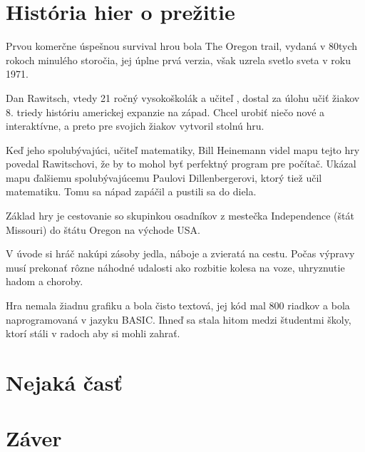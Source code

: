 \documentclass[10pt,twoside,slovak,a4paper]{article}
\begin{document}
\section{História hier o prežitie }
Prvou komerčne úspešnou survival hrou bola The Oregon trail, vydaná v 80tych rokoch minulého storočia, jej úplne prvá verzia, však uzrela svetlo sveta v roku 1971. 

Dan Rawitsch, vtedy 21 ročný vysokoškolák a učiteľ , dostal za úlohu učiť žiakov 8. triedy históriu americkej expanzie na západ. Chcel urobiť niečo nové a interaktívne, a preto pre svojich žiakov vytvoril stolnú hru. 

Keď jeho spolubývajúci, učiteľ matematiky,  Bill Heinemann videl mapu tejto hry povedal Rawitschovi, že by to mohol byť perfektný program pre počítač. Ukázal mapu ďalšiemu spolubývajúcemu Paulovi Dillenbergerovi, ktorý tiež učil matematiku. Tomu sa nápad zapáčil a pustili sa do diela. 

Základ hry je cestovanie so skupinkou osadníkov z mestečka Independence (štát Missouri) do štátu Oregon na východe  USA.

V úvode si hráč nakúpi zásoby jedla, náboje a zvieratá na cestu.  Počas výpravy musí prekonať rôzne náhodné udalosti ako rozbitie kolesa na voze, uhryznutie hadom a choroby.

Hra nemala žiadnu grafiku a bola čisto textová, jej kód mal 800 riadkov a bola naprogramovaná v jazyku BASIC. Ihneď sa stala hitom medzi študentmi školy, ktorí stáli v radoch aby si mohli zahrať. 


\cite{Toppo}

\cite{IGN}

\section{Nejaká časť} \label{nejaka}

\cite{Reid}








\section{Záver} \label{zaver} %




\newpage

\end{document}
